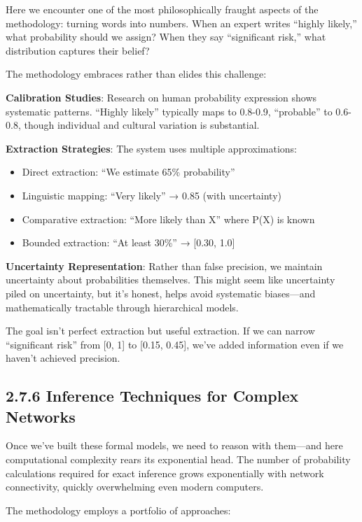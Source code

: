\documentclass[
  11pt,
  letterpaper,
]{book}
\providecommand{\tightlist}{%
  \setlength{\itemsep}{0pt}\setlength{\parskip}{0pt}}
\begin{document}
Here we encounter one of the most philosophically fraught aspects of the
methodology: turning words into numbers. When an expert writes ``highly
likely,'' what probability should we assign? When they say ``significant
risk,'' what distribution captures their belief?

The methodology embraces rather than elides this challenge:

\textbf{Calibration Studies}: Research on human probability expression
shows systematic patterns. ``Highly likely'' typically maps to 0.8-0.9,
``probable'' to 0.6-0.8, though individual and cultural variation is
substantial.

\textbf{Extraction Strategies}: The system uses multiple approximations:

\begin{itemize}
\tightlist
\item
  Direct extraction: ``We estimate 65\% probability''
\item
  Linguistic mapping: ``Very likely'' → 0.85 (with uncertainty)
\item
  Comparative extraction: ``More likely than X'' where P(X) is known
\item
  Bounded extraction: ``At least 30\%'' → {[}0.30, 1.0{]}
\end{itemize}

\textbf{Uncertainty Representation}: Rather than false precision, we
maintain uncertainty about probabilities themselves. This might seem
like uncertainty piled on uncertainty, but it's honest, helps avoid
systematic biases---and mathematically tractable through hierarchical
models.

The goal isn't perfect extraction but useful extraction. If we can
narrow ``significant risk'' from {[}0, 1{]} to {[}0.15, 0.45{]}, we've
added information even if we haven't achieved precision.

\subsection{2.7.6 Inference Techniques for Complex
Networks}\label{sec-inference-techniques}

Once we've built these formal models, we need to reason with them---and
here computational complexity rears its exponential head. The number of
probability calculations required for exact inference grows
exponentially with network connectivity, quickly overwhelming even
modern computers.

The methodology employs a portfolio of approaches:
\end{document}
